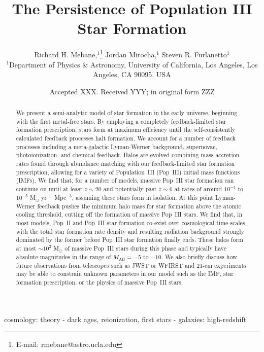 \documentclass[a4paper,fleqn,usenatbib]{mnras}
\title[Pop III]{The Persistence of Population III Star Formation}
\author[R. H. Mebane et al.]{
Richard H. Mebane,$^{1}$\thanks{E-mail: rmebane@astro.ucla.edu}
Jordan Mirocha,$^{1}$
Steven R. Furlanetto$^{1}$
\\
$^{1}$Department of Physics \& Astronomy, University of California, Los Angeles, Los Angeles, CA 90095, USA
}
\date{Accepted XXX. Received YYY; in original form ZZZ}
\begin{document}
\label{firstpage}
\pagerange{\pageref{firstpage}--\pageref{lastpage}}
\maketitle

\begin{abstract}
We present a semi-analytic model of star formation in the early universe, beginning with the first metal-free stars. By employing a completely feedback-limited star formation prescription, stars form at maximum efficiency until the self-consistently calculated feedback processes 
halt formation. We account for a number of feedback processes including a meta-galactic Lyman-Werner background, supernovae, photoionization, and chemical feedback. Halos are evolved combining mass accretion rates found through abundance matching with our feedback-limited star formation prescription, allowing for a variety of Population~III (Pop~III) initial mass functions (IMFs). We find that, for a number of models, 
massive Pop~III star formation can continue on until at least $z \sim 20$ and potentially past $z \sim 6$ at rates of around $10^{-4}$ to $10^{-5}$ M$_\odot$ yr$^{-1}$ Mpc$^{-3}$, assuming these stars form in isolation. At this point Lyman-Werner feedback pushes the minimum halo mass for star formation above the atomic cooling threshold, cutting off the formation of massive Pop~III stars. We find that, in most models, Pop~II and Pop~III star formation co-exist over cosmological time-scales, with the total star formation rate density and resulting radiation background strongly dominated by the former before Pop~III star formation finally ends.
These halos form at most $\sim 10^3$ M$_\odot$ of massive Pop~III stars during this phase and typically have absolute magnitudes in the range of 
$M_\text{AB} = -5 $ to $ -10$. We also briefly discuss how future observations from telescopes such as JWST or WFIRST and 21-cm experiments may be able to constrain unknown parameters in our model such as the IMF, star formation prescription, or the physics of massive Pop~III stars.
\end{abstract}
\begin{keywords}
cosmology: theory - dark ages, reionization, first stars - galaxies: high-redshift
\end{keywords}

\end{document}

